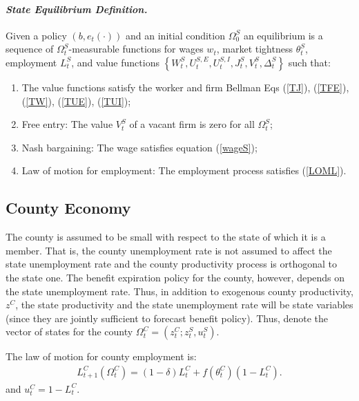 \documentclass[12pt]{article}
\newcommand{\1}{\mathbf{1}}
\newcommand{\ust}{u^S_t}
\newcommand{\uct}{u^C_t}
\newcommand{\zst}{z^S_t}
\newcommand{\zct}{z^C_t}
\newcommand{\tst}{\theta^S_t}
\newcommand{\tct}{\theta^C_t}
\newcommand{\ost}{\Omega^S_t}
\newcommand{\oct}{\Omega^C_t}
\begin{document}
\begin{appendix}
\vspace{-0.3cm}\paragraph{\textit{State Equilibrium Definition.}}
Given a policy $\left(b,e_t\left(\cdot\right)\right)$ and an initial condition $\Omega^S_0$ an equilibrium is a sequence of $\ost$-measurable functions for wages $w_t$, market tightness $\tst$, employment $L^S_t$, and value functions
$\left\{W^S_t, U_t^{S,E}, U_t^{S,I}, J^S_t, V^S_t, \Delta^S_t\right\}$ such that:
\begin{enumerate}
\vspace{-0.2cm}\item The value functions satisfy the worker and firm Bellman Eqs (\ref{TJ}), (\ref{TFE}), (\ref{TW}), (\ref{TUE}),  (\ref{TUI});
\vspace{-0.2cm}\item Free entry: The value $V^S_t$ of a vacant firm is zero for all $\ost$;
\vspace{-0.2cm}\item Nash bargaining: The wage satisfies equation (\ref{wageS});
\vspace{-0.2cm}\item Law of motion for employment: The employment process satisfies (\ref{LOML}).
\end{enumerate}

\subsection{County Economy}

The county is assumed to be small with respect to the state of which it is a member.  That is, the county unemployment rate is not assumed to affect the state unemployment rate and the county productivity process is orthogonal to the state one.  The benefit expiration policy for the county, however, depends on the state unemployment rate.  Thus, in addition to exogenous county productivity, $z^C$, the state productivity and the state unemployment rate will be state variables (since they are jointly sufficient to forecast benefit policy).  Thus, denote the vector of states for the county $\oct=\left(\zct;\zst,\ust\right)$.  

The law of motion for county employment is:
\begin{eqnarray}
L^C_{t+1}(\oct)=(1-\delta)L^C_{t}+f(\tct)\left(1-L^C_t\right). \label{app_eq:LOML}
\end{eqnarray}
and $\uct=1-L^C_t$.


\end{appendix}
\end{document}
